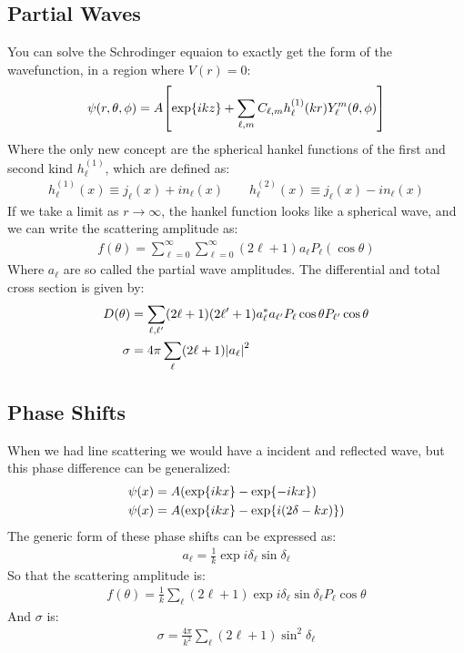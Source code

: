 \subsection{Partial Waves}
You can solve the Schrodinger equaion to exactly get the form of the wavefunction, in a region where $V(r)=0$:
\begin{align*}
  \psi(r,\theta,\phi)=A\qty[\exp{ikz}+\sum_{\ell,m}C_{\ell,m}h_{\ell}^{(1)}(kr)
    Y_\ell^m(\theta,\phi)]
\end{align*}
Where the only new concept are the spherical hankel functions of the first and second kind $h_\ell^{(1)}$, which are defined as:
\begin{align*}
  h_\ell^{(1)}(x)\equiv j_{\ell}(x)+i n_{\ell}(x)\qquad
  h_\ell^{(2)}(x)\equiv j_{\ell}(x)-i n_{\ell}(x)
\end{align*}
If we take a limit as $r\to\infty$, the hankel function looks like a spherical wave, and we can write the scattering amplitude as:
\begin{align*}
  f(\theta)=\sum_{\ell=0}^\infty\sum_{\ell=0}^{\infty}(2\ell+1)a_\ell P_\ell(\cos\theta)
\end{align*}
Where $a_\ell$ are so called the partial wave amplitudes. The differential and total cross section is given by:
\begin{align*}
  D(\theta)&=\sum_{\ell,\ell'}(2\ell+1)(2\ell'+1)
  a^*_{\ell}a_{\ell'}P_\ell\cos\theta P_{\ell'}\cos\theta\\
  \sigma&=4\pi\sum_{\ell}(2\ell+1)\abs{a_\ell}^2
\end{align*}
\subsection{Phase Shifts}
When we had line scattering we would have a incident and reflected wave, but this phase difference can be generalized:
\begin{align*}
  \psi(x)&=A\qty(\exp{ikx}-\exp{-ikx})\\
  \psi(x)&=A\qty(\exp{ikx}-\exp{i(2\delta-kx)})
\end{align*}
The generic form of these phase shifts can be expressed as:
\begin{align*}
  a_\ell=\frac{1}{k}\exp{i\delta_\ell}\sin\delta_\ell
\end{align*}
So that the scattering amplitude is:
\begin{align*}
  f(\theta)=\frac{1}{k}\sum_{\ell}(2\ell+1)\exp{i\delta_\ell}\sin\delta_\ell P_\ell\cos\theta
\end{align*}
And $\sigma$ is:
\begin{align*}
  \sigma=\frac{4\pi}{k^2}\sum_\ell(2\ell+1)\sin^2\delta_\ell
\end{align*}
